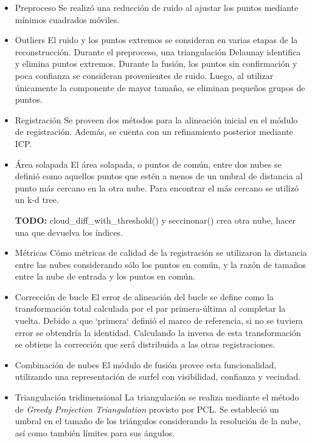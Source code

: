 \documentclass{pfc}
\newcommand{\Alerta}[1]{{\Huge\bfseries\sffamily#1}}
\begin{document}
		\begin{itemize}
			\item{Preproceso}
				Se realizó una reducción de ruido al ajustar los puntos mediante mínimos cuadrados móviles.

			\item {Outliers}
				El ruido y los puntos extremos se consideran en varias etapas de la reconstrucción.
				Durante el preproceso, una triangulación Delaunay identifica y elimina puntos extremos.
				Durante la fusión, los puntos sin confirmación y poca confianza se consideran provenientes de ruido.
				Luego, al utilizar únicamente la componente de mayor tamaño, se eliminan pequeños grupos de puntos.

			\item {Registración}
				Se proveen dos métodos para la alineación inicial en el módulo de registración.
				Además, se cuenta con un refinamiento posterior mediante ICP.

			\item {Área solapada}
				El área solapada, o puntos de común, entre dos nubes
				se definió como aquellos puntos que estén a menos de un umbral de distancia
				al punto más cercano en la otra nube.
				Para encontrar el más cercano se utilizó un k-d tree.

				\Alerta{TODO:} cloud\_diff\_with\_threshold() y seccinonar() crea otra nube, hacer una que devuelva los índices.

			\item {Métricas}
				Cómo métricas de calidad de la registración se utilizaron la distancia entre
				las nubes considerando sólo los puntos en común, y la razón de tamaños entre la
				nube de entrada y los puntos en común.

			\item {Corrección de bucle}
				El error de alineación del bucle se define como la transformación total
				calculada por el par primera-última al completar la vuelta. Debido a que `primera`
				definió el marco de referencia, si no se tuviera error se obtendría la identidad.
				Calculando la inversa de esta transformación se obtiene la corrección que será distribuida
				a las otras registraciones.

			\item {Combinación de nubes}
				El módulo de fusión provee esta funcionalidad, utilizando una
				representación de surfel con visibilidad, confianza y vecindad.

			\item {Triangulación tridimensional}
				La triangulación se realiza mediante el método de \emph{Greedy
				Projection Triangulation} provisto por PCL.
				Se estableció un umbral en el tamaño de los triángulos considerando la resolución de la nube,
				así como también límites para sus ángulos.


\end{itemize}
\end{document}
